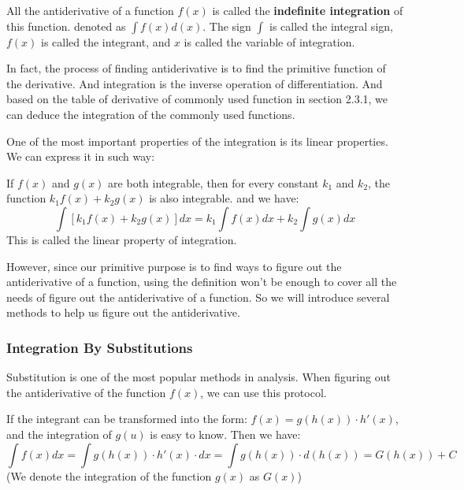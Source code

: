 \documentclass[oneside]{book}
\begin{document}
\begin{definition}
All the antiderivative of a function $f(x)$ is called the \textbf{indefinite integration} of this function. denoted as $\int f(x)d(x)$. The sign $\int$ is called the integral sign, $f(x)$ is called the integrant, and $x$ is called the variable of integration.
\end{definition}

In fact, the process of finding antiderivative is to find the primitive function of the derivative. And integration is the inverse operation of differentiation. And based on the table of derivative of commonly used function in section 2.3.1, we can deduce the integration of the commonly used functions.

One of the most important properties of the integration is its linear properties. We can express it in such way:

\begin{theorem}
If $f(x)$ and $g(x)$ are both integrable, then for every constant $k_1$ and $k_2$, the function $k_1f(x)+k_2g(x)$ is also integrable. and we have:
\[
\int[k_1f(x)+k_2g(x)]dx = k_1\int f(x) dx+k_2\int g(x)dx
\]
This is called the linear property of integration.
\end{theorem}

However, since our primitive purpose is to find ways to figure out the antiderivative of a function, using the definition won't be enough to cover all the needs of figure out the antiderivative of a function. So we will introduce several methods to help us figure out the antiderivative.

\newpage

\subsubsection{Integration By Substitutions}
Substitution is one of the most popular methods in analysis. When figuring out the antiderivative of the function $f(x)$, we can use this protocol.

\begin{definition}
If the integrant can be transformed into the form: $f(x) = g(h(x))\cdot h'(x)$, and the integration of $g(u)$ is easy to know. Then we have:
\[
\int f(x)dx = \int g(h(x))\cdot h'(x)\cdot dx = \int g(h(x)) \cdot d(h(x)) = G(h(x)) +C
\]
(We denote the integration of the function $g(x)$ as $G(x)$) \\
\\
\end{definition}
\end{document}
